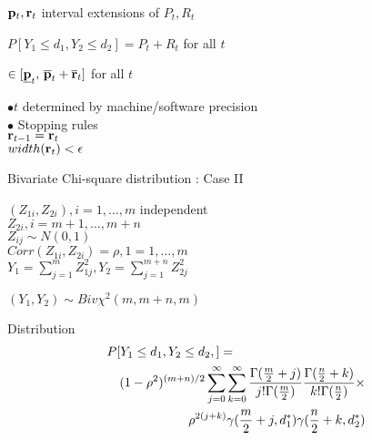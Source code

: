 \documentclass{slides}
\begin{document}
\begin{slide}

${\bf p}_t, {\bf r}_t$ interval extensions of $P_t, R_t$ 

$P[Y_1 \leq d_1, Y_2 \leq d_2] = P_t + R_t$ for all $t$

$\in [ \underline{\bf p}_t , \,
       \overline{\bf p}_t + \overline{\bf r}_t]$ for all $t$

$\bullet t $ determined by machine/software precision \\
$\bullet$ Stopping rules \\
${\bf r}_{t-1} = {\bf r}_t$ \\
$ width({\bf r}_t) < \epsilon $

\end{slide}
\begin{slide}
\begin{center}
Bivariate Chi-square distribution : Case II
\end{center}
$(Z_{1i}, Z_{2i}), i = 1,\ldots,m $ independent \\
$Z_{2i}, i = m+1, \ldots, m+n$ \\
$Z_{ij} \sim N(0,1)$ \\
$Corr(Z_{1i},Z_{2i}) = \rho, 1=1,\ldots, m$ \\
$Y_1 = \sum_{j=1}^m Z_{1j}^2, Y_2 = \sum_{j=1}^{m+n} Z_{2j}^2$

$(Y_1, Y_2) \sim Biv \chi^2(m,m+n,m)$

Distribution
\begin{eqnarray*}
\lefteqn{P[Y_1 \leq d_1, Y_2 \leq d_2, ] = } \\
  & & (1-\rho^2)^{(m+n)/2} 
	\sum_{j=0}^\infty \sum_{k=0}^\infty 
	\frac{ \Gamma (\frac{m}{2}+j)}{ j! \Gamma (\frac{m}{2})  }
  \frac{ \Gamma (\frac{n}{2}+k)}{ k! \Gamma (\frac{n}{2})  } \times \\
  & & \rho^{2(j+k)} 
	\gamma (\frac{m}{2}+j, d_1^* )  \gamma (\frac{n}{2}+k, d_2^* ) 
\end{eqnarray*}
\end{slide}
\end{document}
